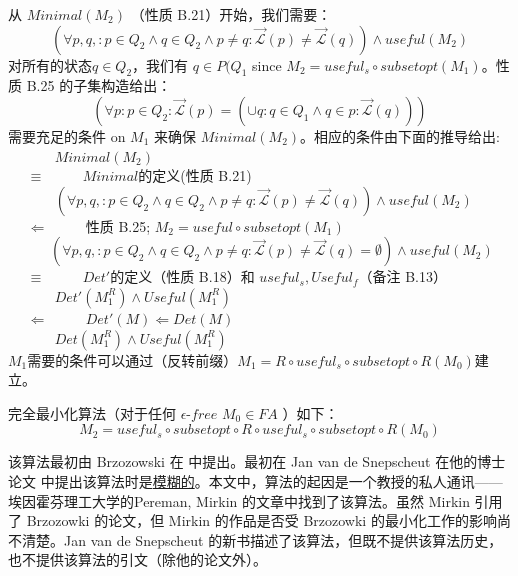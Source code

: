 从 $Minimal(M_2)$  （性质 B.21）开始，我们需要：
$$ (\forall p,q,:p\in Q_2 \land q \in Q_2 \land p \not= q : \overrightarrow{\mathcal{L}}(p) \not= \overrightarrow{\mathcal{L}}(q)) \land useful(M_2)   $$ 
对所有的状态$q\in Q_2$，我们有 $q\in P(Q_1$ since $M_2 = useful_s \circ subsetopt(M_1)$。性质 B.25 的子集构造给出： 
$$ (\forall p:p\in Q_2 : \overrightarrow{\mathcal{L}}(p) = (\cup q:q \in Q_1 \land q \in p:\overrightarrow{\mathcal{L}}(q)) ) $$ 
需要充足的条件 on $M_1$ 来确保 $Minimal(M_2)$。相应的条件由下面的推导给出: \\
\mbox{　　　} $Minimal(M_2)$ \\
\mbox{　} $\equiv$ \mbox{　　} {$Minimal$的定义(性质 B.21)} \\
\mbox{　　　} $ (\forall p,q,:p\in Q_2 \land q \in Q_2 \land p \not= q : \overrightarrow{\mathcal{L}}(p) \not= \overrightarrow{\mathcal{L}}(q)) \land useful(M_2)$ \\
\mbox{　} $ \Leftarrow $ \mbox{　　} { 性质 B.25; $M_2 = useful \circ subsetopt(M_1)$ } \\
\mbox{　　　}$ (\forall p,q,:p\in Q_2 \land q \in Q_2 \land p \not= q : \overrightarrow{\mathcal{L}}(p) \not= \overrightarrow{\mathcal{L}}(q) = \emptyset) \land useful(M_2)$ \\
\mbox{　} $\equiv $ \mbox{　　} {$Det'$的定义（性质 B.18）和 $useful_s, Useful_f $（备注 B.13） } \\
\mbox{　　　} $Det'(M^R_1) \land Useful(M^R_1)$ \\
\mbox{　} $\Leftarrow $ \mbox{　　} {$Det'(M) \Leftarrow Det(M)$} \\
\mbox{　　　} $Det(M^R_1) \land Useful(M^R_1)$ \\
$M_1$需要的条件可以通过（反转前缀）$M_1=R \circ useful_s \circ subsetopt \circ R(M_0)$建立。

完全最小化算法（对于任何 $\epsilon$-$free$ $M_0\in FA$ ）如下：
$$  M_2 = useful_s \circ subsetopt \circ R \circ useful_s \circ subsetopt \circ R(M_0) $$

该算法最初由 Brzozowski 在 \cite{Brzo62} 中提出。最初在 Jan van de Snepscheut 在他的博士论文 \cite{vdSn85}中提出该算法时是\uline{模糊的}。本文中，算法的起因是一个教授的私人通讯——埃因霍芬理工大学的Pereman, Mirkin \cite{Mirk65} 的文章中找到了该算法。虽然 Mirkin 引用了 Brzozowki \cite{Brzo64} 的论文，但 Mirkin 的作品是否受 Brzozowki 的最小化工作的影响尚不清楚。Jan van de Snepscheut 的新书\cite{VDSn93}描述了该算法，但既不提供该算法历史，也不提供该算法的引文（除他的论文外）。
